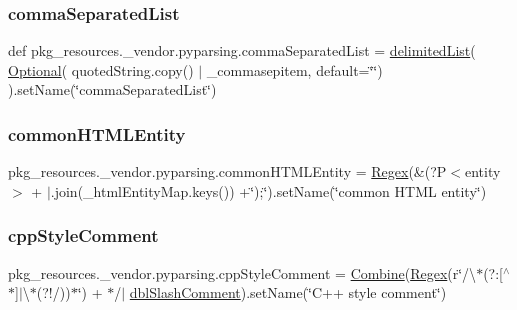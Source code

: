 \subsubsection{\texorpdfstring{comma\+Separated\+List}{commaSeparatedList}}
{\footnotesize\ttfamily def pkg\+\_\+resources.\+\_\+vendor.\+pyparsing.\+comma\+Separated\+List = \hyperlink{namespacepkg__resources_1_1__vendor_1_1pyparsing_aa689efbc59c6d46b1b9c16becee9f1b4}{delimited\+List}( \hyperlink{classpkg__resources_1_1__vendor_1_1pyparsing_1_1_optional}{Optional}( quoted\+String.\+copy() $\vert$ \+\_\+commasepitem, default=\char`\"{}\char`\"{}) ).set\+Name(\char`\"{}comma\+Separated\+List\char`\"{})}

\mbox{\label{namespacepkg__resources_1_1__vendor_1_1pyparsing_aec9dcadfedc632794055e04875c7e014}} 
\subsubsection{\texorpdfstring{common\+H\+T\+M\+L\+Entity}{commonHTMLEntity}}
{\footnotesize\ttfamily pkg\+\_\+resources.\+\_\+vendor.\+pyparsing.\+common\+H\+T\+M\+L\+Entity = \hyperlink{classpkg__resources_1_1__vendor_1_1pyparsing_1_1_regex}{Regex}(\textquotesingle{}\&(?P$<$entity$>$\textquotesingle{} + \textquotesingle{}$\vert$\textquotesingle{}.join(\+\_\+html\+Entity\+Map.\+keys()) +\char`\"{});\char`\"{}).set\+Name(\char`\"{}common H\+T\+ML entity\char`\"{})}

\mbox{\label{namespacepkg__resources_1_1__vendor_1_1pyparsing_a5c2a8db9e78a700e94093aea77dfaaca}} 
\subsubsection{\texorpdfstring{cpp\+Style\+Comment}{cppStyleComment}}
{\footnotesize\ttfamily pkg\+\_\+resources.\+\_\+vendor.\+pyparsing.\+cpp\+Style\+Comment = \hyperlink{classpkg__resources_1_1__vendor_1_1pyparsing_1_1_combine}{Combine}(\hyperlink{classpkg__resources_1_1__vendor_1_1pyparsing_1_1_regex}{Regex}(r\char`\"{}/\textbackslash{}$\ast$(?\+:\mbox{[}$^\wedge$$\ast$\mbox{]}$\vert$\textbackslash{}$\ast$(?!/))$\ast$\char`\"{}) + \textquotesingle{}$\ast$/\textquotesingle{}$\vert$ \hyperlink{namespacepkg__resources_1_1__vendor_1_1pyparsing_a34bf2e5bf5b46d3d0c785fd95b111022}{dbl\+Slash\+Comment}).set\+Name(\char`\"{}C++ style comment\char`\"{})}

